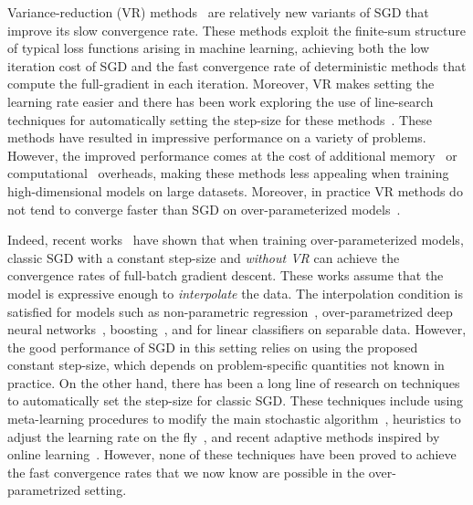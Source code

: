 Variance-reduction (VR) methods~\cite{schmidt2017minimizing,johnson2013accelerating,defazio2014saga} are relatively new variants of SGD that improve its slow convergence rate. These methods exploit the finite-sum structure of typical loss functions arising in machine learning, achieving both the low iteration cost of SGD and the fast convergence rate of deterministic methods that compute the full-gradient in each iteration. Moreover, VR makes setting the learning rate easier and there has been work exploring the use of line-search techniques for automatically setting the step-size for these methods~\cite{schmidt2017minimizing,schmidt2015non,tan2016barzilai,shang2018guaranteed}. These methods have resulted in impressive performance on a variety of problems. However, the improved performance comes at the cost of additional memory~\cite{schmidt2017minimizing} or computational~\cite{johnson2013accelerating, defazio2014saga} overheads, making these methods less appealing when training high-dimensional models on large datasets. Moreover, in practice VR methods do not tend to converge faster than SGD on over-parameterized models~\cite{defazio2018ineffectiveness}. 

Indeed, recent works~\cite{vaswani2019fast,ma2018power,bassily2018exponential,liu2018mass, cevher2018linear, jain2017accelerating, schmidt2013fast} have shown that when training over-parameterized models, classic SGD with a constant step-size and \emph{without VR} can achieve the convergence rates of full-batch gradient descent. These works assume that the model is expressive enough to \emph{interpolate} the data. The interpolation condition is satisfied for models such as non-parametric regression~\cite{liang2018just,belkin2019does}, over-parametrized deep neural networks~\cite{zhang2016understanding}, boosting~\cite{schapire1998boosting}, and for linear classifiers on separable data. However, the good performance of SGD in this setting relies on using the proposed constant step-size, which depends on problem-specific quantities not known in practice. On the other hand, there has been a long line of research on techniques to automatically set the step-size for classic SGD. These techniques include using meta-learning procedures to modify the main stochastic algorithm~\cite{baydin2017online,yu2006fast,schraudolph1999local,almeida1998parameter,plagianakos2001learning,yu2006fast,shao2000rates}, heuristics to adjust the learning rate on the fly~\cite{kushner1995stochastic, deylon1993accelerated, schaul2013no, schoenauer2017stochastic}, and recent adaptive methods inspired by online learning~\cite{duchi2011adaptive,zeiler2012adadelta,kingma2014adam,reddi2019convergence, orabona2017training,rolinek2018l4, luo2019adaptive}. However, none of these techniques have been proved to achieve the fast convergence rates that we now know are possible in the over-parametrized setting.

